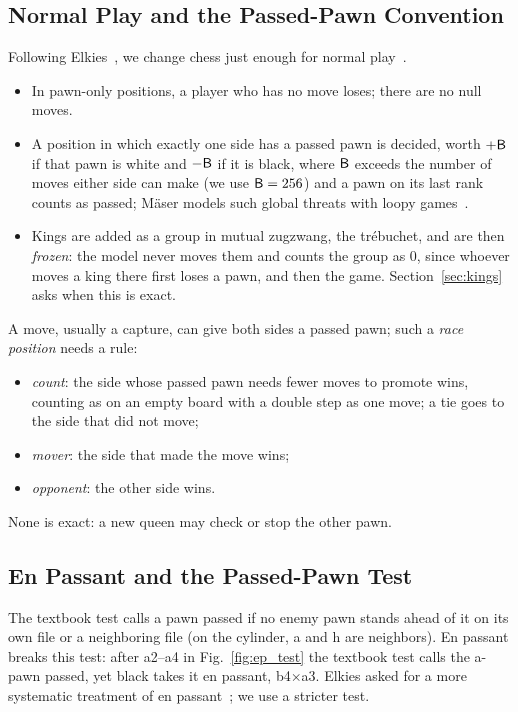 \subsection{Normal Play and the Passed-Pawn Convention}
Following Elkies~\cite{Elkies1996}, we change chess just enough for normal play~\cite{WinningWays}.
\begin{itemize}
\item In pawn-only positions, a player who has no move loses; there are no null moves.
\item A position in which exactly one side has a passed pawn is decided, worth $+\mathsf{B}$ if that pawn is white and
  $-\mathsf{B}$ if it is black, where $\mathsf{B}$ exceeds the number of moves either side can make (we use $\mathsf{B}=256$) and a pawn on its last rank counts as passed;
  M\"aser models such global threats with loopy games~\cite{Maeser2002}.
\item Kings are added as a group in mutual zugzwang, the tr\'ebuchet, and are then \emph{frozen}: the model
  never moves them and counts the group as $0$, since whoever moves a king there first loses a pawn, and then
  the game. Section~\ref{sec:kings} asks when this is exact.
\end{itemize}
A move, usually a capture, can give both sides a passed pawn; such a \emph{race position} needs a rule:
\begin{itemize}
\item \emph{count}: the side whose passed pawn needs fewer moves to promote wins, counting as on an empty
  board with a double step as one move; a tie goes to the side that did not move;
\item \emph{mover}: the side that made the move wins;
\item \emph{opponent}: the other side wins.
\end{itemize}
None is exact: a new queen may check or stop the other pawn.

\subsection{En Passant and the Passed-Pawn Test}\label{sec:ep}
The textbook test calls a pawn passed if no enemy pawn stands ahead of it on its own file or a neighboring file
(on the cylinder, a and h are neighbors). En passant breaks this test: after a2--a4 in Fig.~\ref{fig:ep_test}
the textbook test calls the a-pawn passed, yet black takes it en passant, b4$\times$a3. Elkies asked for a
more systematic treatment of en passant~\cite{Elkies1996}; we use a stricter test.

